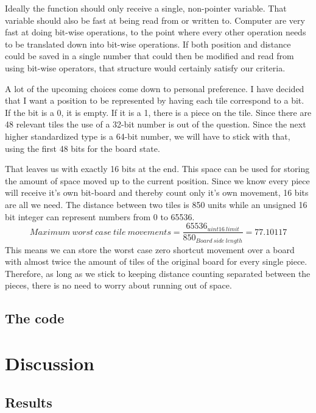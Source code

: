 \documentclass[12pt]{article} %
\begin{document}
Ideally the function should only receive a single, non-pointer variable. That variable should also be fast at being read from or written to. 
Computer are very fast at doing bit-wise operations, to the point where every other operation needs to be translated down into bit-wise operations. If both position and distance could be saved in a single number that could then be modified and read from using bit-wise operators, that structure would certainly satisfy our criteria.

A lot of the upcoming choices come down to personal preference. I have decided that I want a position to be represented by having each tile correspond to a bit. If the bit is a 0, it is empty. If it is a 1, there is a piece on the tile. Since there are 48 relevant tiles the use of a 32-bit number is out of the question. Since the next higher standardized type is a 64-bit number, we will have to stick with that, using the first 48 bits for the board state.

That leaves us with exactly 16 bits at the end. This space can be used for storing the amount of space moved up to the current position. Since we know every piece will receive it's own bit-board and thereby count only it's own movement, 16 bits are all we need. The distance between two tiles is 850 units while an unsigned 16 bit integer can represent numbers from 0 to 65536.
\[
    Maximum~worst~case~tile ~movements = \frac{65536_{uint16~limit}}{850_{Board~side~length}} = 77.10117
\]
This means we can store the worst case zero shortcut movement over a board with almost twice the amount of tiles of the original board for every single piece. Therefore, as long as we stick to keeping distance counting separated between the pieces, there is no need to worry about running out of space.

\subsection{The code}


\section{Discussion}

\subsection{Results}
\end{document}
